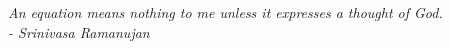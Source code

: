 \begin{epigrafe}
    \vspace*{\fill}
	\begin{flushright}
		\textit{An equation means nothing to me unless it expresses a thought of God. \\
		- Srinivasa Ramanujan}
	\end{flushright}
\end{epigrafe}
